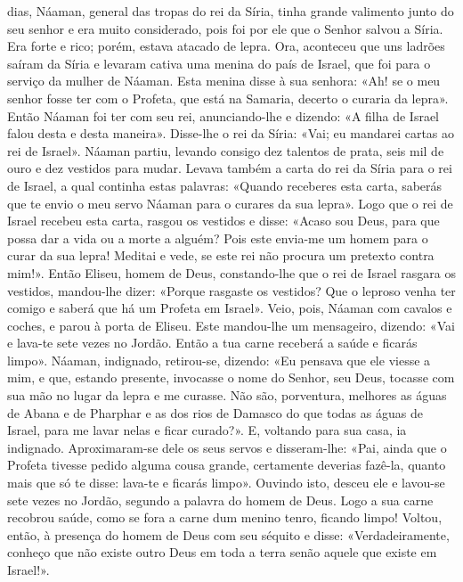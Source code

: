 \begin{paracol}{2}
{ dias, Náaman, general das tropas do rei da Síria, tinha grande valimento junto do seu senhor e era muito considerado, pois foi por ele que o Senhor salvou a Síria. Era forte e rico; porém, estava atacado de lepra. Ora, aconteceu que uns ladrões saíram da Síria e levaram cativa uma menina do país de Israel, que foi para o serviço da mulher de Náaman. Esta menina disse à sua senhora: «Ah! se o meu senhor fosse ter com o Profeta, que está na Samaria, decerto o curaria da lepra». Então Náaman foi ter com seu rei, anunciando-lhe e dizendo: «A filha de Israel falou desta e desta maneira». Disse-lhe o rei da Síria: «Vai; eu mandarei cartas ao rei de Israel». Náaman partiu, levando consigo dez talentos de prata, seis mil de ouro e dez vestidos para mudar. Levava também a carta do rei da Síria para o rei de Israel, a qual continha estas palavras: «Quando receberes esta carta, saberás que te envio o meu servo Náaman para o curares da sua lepra». Logo que o rei de Israel recebeu esta carta, rasgou os vestidos e disse: «Acaso sou Deus, para que possa dar a vida ou a morte a alguém? Pois este envia-me um homem para o curar da sua lepra! Meditai e vede, se este rei não procura um pretexto contra mim!». Então Eliseu, homem de Deus, constando-lhe que o rei de Israel rasgara os vestidos, mandou-lhe dizer: «Porque rasgaste os vestidos? Que o leproso venha ter comigo e saberá que há um Profeta em Israel». Veio, pois, Náaman com cavalos e coches, e parou à porta de Eliseu. Este mandou-lhe um mensageiro, dizendo: «Vai e lava-te sete vezes no Jordão. Então a tua carne receberá a saúde e ficarás limpo». Náaman, indignado, retirou-se, dizendo: «Eu pensava que ele viesse a mim, e que, estando presente, invocasse o nome do Senhor, seu Deus, tocasse com sua mão no lugar da lepra e me curasse. Não são, porventura, melhores as águas de Abana e de Pharphar e as dos rios de Damasco do que todas as águas de Israel, para me lavar nelas e ficar curado?». E, voltando para sua casa, ia indignado. Aproximaram-se dele os seus servos e disseram-lhe: «Pai, ainda que o Profeta tivesse pedido alguma cousa grande, certamente deverias fazê-la, quanto mais que só te disse: lava-te e ficarás limpo». Ouvindo isto, desceu ele e lavou-se sete vezes no Jordão, segundo a palavra do homem de Deus. Logo a sua carne recobrou saúde, como se fora a carne dum menino tenro, ficando limpo! Voltou, então, à presença do homem de Deus com seu séquito e disse: «Verdadeiramente, conheço que não existe outro Deus em toda a terra senão aquele que existe em Israel!».
}\end{paracol}

